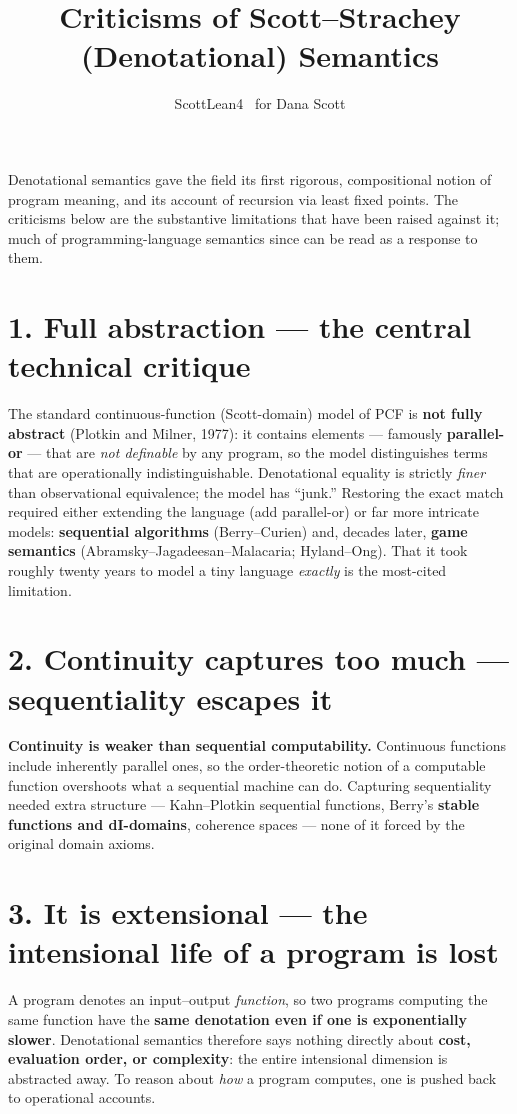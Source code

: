 \documentclass[11pt]{article}
\title{Criticisms of Scott--Strachey (Denotational) Semantics}
\author{ScottLean4 \textperiodcentered\ for Dana Scott}
\date{}
\begin{document}
\maketitle

Denotational semantics gave the field its first rigorous, compositional notion of
program meaning, and its account of recursion via least fixed points. The
criticisms below are the substantive limitations that have been raised against
it; much of programming-language semantics since can be read as a response to
them.

\section*{1. Full abstraction --- the central technical critique}
The standard continuous-function (Scott-domain) model of PCF is \textbf{not fully
abstract} (Plotkin and Milner, 1977): it contains elements --- famously
\textbf{parallel-or} --- that are \emph{not definable} by any program, so the
model distinguishes terms that are operationally indistinguishable. Denotational
equality is strictly \emph{finer} than observational equivalence; the model has
``junk.'' Restoring the exact match required either extending the language (add
parallel-or) or far more intricate models: \textbf{sequential algorithms}
(Berry--Curien) and, decades later, \textbf{game semantics}
(Abramsky--Jagadeesan--Malacaria; Hyland--Ong). That it took roughly twenty years
to model a tiny language \emph{exactly} is the most-cited limitation.

\section*{2. Continuity captures too much --- sequentiality escapes it}
\textbf{Continuity is weaker than sequential computability.} Continuous functions
include inherently parallel ones, so the order-theoretic notion of a computable
function overshoots what a sequential machine can do. Capturing sequentiality
needed extra structure --- Kahn--Plotkin sequential functions, Berry's
\textbf{stable functions and dI-domains}, coherence spaces --- none of it forced
by the original domain axioms.

\section*{3. It is extensional --- the intensional life of a program is lost}
A program denotes an input--output \emph{function}, so two programs computing the
same function have the \textbf{same denotation even if one is exponentially
slower}. Denotational semantics therefore says nothing directly about
\textbf{cost, evaluation order, or complexity}: the entire intensional dimension
is abstracted away. To reason about \emph{how} a program computes, one is pushed
back to operational accounts.
\end{document}
